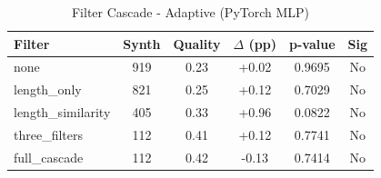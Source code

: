 \begin{table}[htbp]
\centering
\caption{Filter Cascade - Adaptive (PyTorch MLP)}
\label{tab:pytorch_filter_v2}
\begin{tabular}{lccccc}
\toprule
Filter & Synth & Quality & $\Delta$ (pp) & p-value & Sig \\
\midrule
none & 919 & 0.23 & +0.02 & 0.9695 & No \\
length\_only & 821 & 0.25 & +0.12 & 0.7029 & No \\
length\_similarity & 405 & 0.33 & +0.96 & 0.0822 & No \\
three\_filters & 112 & 0.41 & +0.12 & 0.7741 & No \\
full\_cascade & 112 & 0.42 & -0.13 & 0.7414 & No \\
\bottomrule
\end{tabular}
\end{table}
